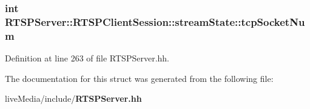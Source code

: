 \subsubsection[{tcp\+Socket\+Num}]{\setlength{\rightskip}{0pt plus 5cm}int R\+T\+S\+P\+Server\+::\+R\+T\+S\+P\+Client\+Session\+::stream\+State\+::tcp\+Socket\+Num}\label{structRTSPServer_1_1RTSPClientSession_1_1streamState_a0314d4f4a0fc6598e91179278c365275}


Definition at line 263 of file R\+T\+S\+P\+Server.\+hh.



The documentation for this struct was generated from the following file\+:\begin{DoxyCompactItemize}
\item 
live\+Media/include/{\bf R\+T\+S\+P\+Server.\+hh}\end{DoxyCompactItemize}
